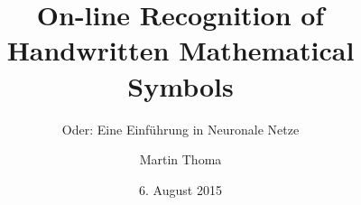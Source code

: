 \documentclass{beamer}
\begin{document}
\title{On-line Recognition of Handwritten Mathematical Symbols}
\subtitle{Oder: Eine Einführung in Neuronale Netze}
\author{Martin Thoma}
\date{6. August 2015}
\subject{On-line Recognition of Handwritten Mathematical Symbols}

\frame{\titlepage}


% 

\end{document}
